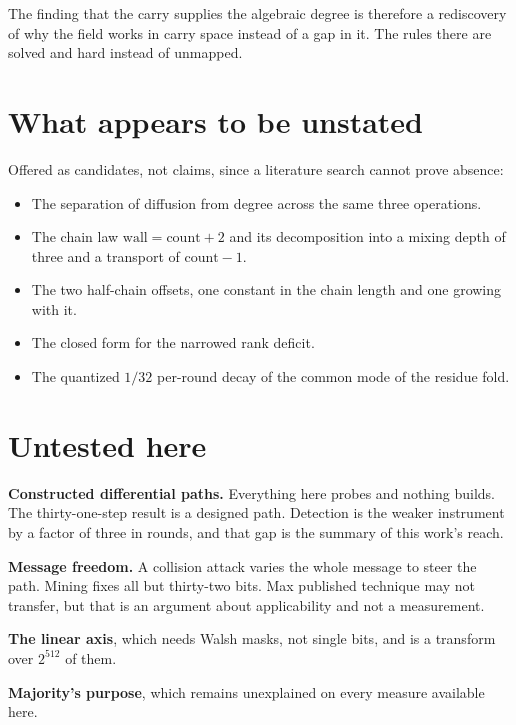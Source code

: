 The finding that the carry supplies the algebraic degree is therefore a rediscovery of why the field works in carry space instead of a gap in it. The rules there are solved and hard instead of unmapped.

\section{What appears to be unstated}

Offered as candidates, not claims, since a literature search cannot prove absence:

\begin{itemize}
  \item The separation of diffusion from degree across the same three operations.
  \item The chain law \(\mathrm{wall} = \mathrm{count} + 2\) and its decomposition into a mixing depth of three and a transport of \(\mathrm{count} - 1\).
  \item The two half-chain offsets, one constant in the chain length and one growing with it.
  \item The closed form for the narrowed rank deficit.
  \item The quantized \(1/32\) per-round decay of the common mode of the residue fold.
\end{itemize}

\section{Untested here}

\textbf{Constructed differential paths.} Everything here probes and nothing builds. The thirty-one-step result is a designed path. Detection is the weaker instrument by a factor of three in rounds, and that gap is the summary of this work's reach.

\textbf{Message freedom.} A collision attack varies the whole message to steer the path. Mining fixes all but thirty-two bits. Max published technique may not transfer, but that is an argument about applicability and not a measurement.

\textbf{The linear axis}, which needs Walsh masks, not single bits, and is a transform over \(2^{512}\) of them.

\textbf{Majority's purpose}, which remains unexplained on every measure available here.
